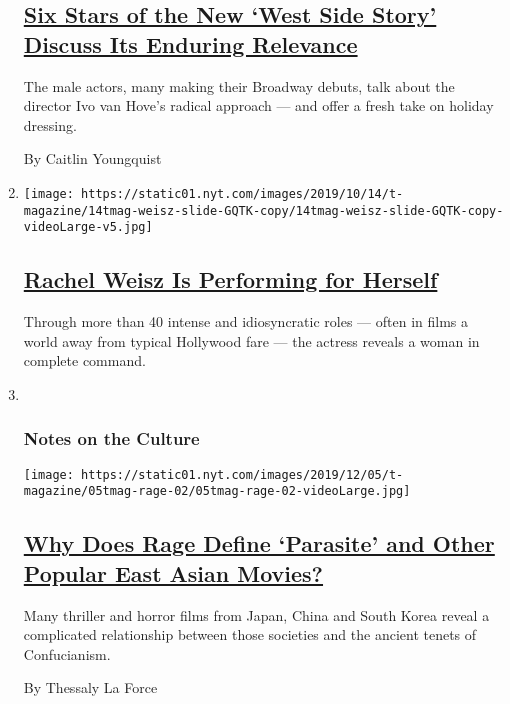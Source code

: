 \begin{enumerate}
  \hypertarget{six-stars-of-the-new-west-side-story-discuss-its-enduring-relevance}{%
  \subsection{\texorpdfstring{\href{/2019/12/18/t-magazine/west-side-story-broadway.html}{Six
  Stars of the New `West Side Story' Discuss Its Enduring
  Relevance}}{Six Stars of the New `West Side Story' Discuss Its Enduring Relevance}}\label{six-stars-of-the-new-west-side-story-discuss-its-enduring-relevance}}

  The male actors, many making their Broadway debuts, talk about the
  director Ivo van Hove's radical approach --- and offer a fresh take on
  holiday dressing.

  By Caitlin Youngquist
\item
  \texttt{[image: https://static01.nyt.com/images/2019/10/14/t-magazine/14tmag-weisz-slide-GQTK-copy/14tmag-weisz-slide-GQTK-copy-videoLarge-v5.jpg]}

  \hypertarget{rachel-weisz-is-performing-for-herself}{%
  \subsection{\texorpdfstring{\href{/interactive/2019/10/15/t-magazine/rachel-weisz-acting-movies.html}{Rachel
  Weisz Is Performing for
  Herself}}{Rachel Weisz Is Performing for Herself}}\label{rachel-weisz-is-performing-for-herself}}

  Through more than 40 intense and idiosyncratic roles --- often in
  films a world away from typical Hollywood fare --- the actress reveals
  a woman in complete command.
\item ~
  \hypertarget{notes-on-the-culture-1}{%
  \subsubsection{Notes on the Culture}\label{notes-on-the-culture-1}}

  \texttt{[image: https://static01.nyt.com/images/2019/12/05/t-magazine/05tmag-rage-02/05tmag-rage-02-videoLarge.jpg]}

  \hypertarget{why-does-rage-define-parasite-and-other-popular-east-asian-movies}{%
  \subsection{\texorpdfstring{\href{/2019/11/25/t-magazine/asia-movies-parasite.html}{Why
  Does Rage Define `Parasite' and Other Popular East Asian
  Movies?}}{Why Does Rage Define `Parasite' and Other Popular East Asian Movies?}}\label{why-does-rage-define-parasite-and-other-popular-east-asian-movies}}

  Many thriller and horror films from Japan, China and South Korea
  reveal a complicated relationship between those societies and the
  ancient tenets of Confucianism.

  By Thessaly La Force
\end{enumerate}

